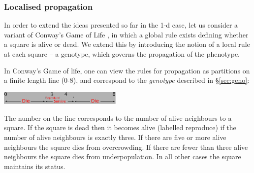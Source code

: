\documentclass{AISB2008}
\begin{document}

\subsubsection{Localised propagation} \label{sec:2dlocal}
In order to extend the ideas presented so far in the 1-d case, let us
consider a variant of Conway's Game of Life \cite{conway}, in which a
global rule exists defining whether a square is alive or dead. We
extend this by introducing the notion of a local rule at each square
-- a genotype, which governs the propagation of the phenotype. 

In Conway's Game of life, one can view the rules for propagation as
partitions on a finite length line (0-8), and correspond to the {\em
  genotype} described in \S\ref{sec:geno}:
\begin{center}
\includegraphics[width=0.45\textwidth]{conway.pdf}
\end{center}
The number on the line corresponds to the number of alive neighbours
to a square. If the square is dead then it becomes alive (labelled
reproduce) if the number of alive neighbours is exactly three. If
there are five or more alive neighbours the square dies from
overcrowding. If there are fewer than three alive neighbours the
square dies from underpopulation. In all other cases the square
maintains its status.

\end{document}
